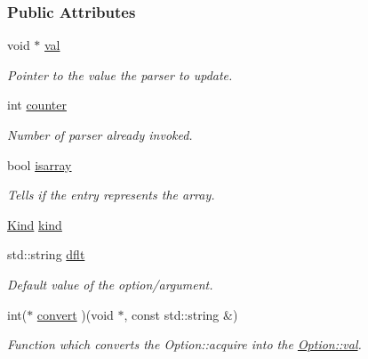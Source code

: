 \subsubsection*{Public Attributes}
\begin{DoxyCompactItemize}
\item 
void $\ast$ \hyperlink{classpoptmx_1_1Option_a8bf55fc70387f6c8929538f420d99658}{val}
\begin{DoxyCompactList}\small\item\em Pointer to the value the parser to update. \item\end{DoxyCompactList}\item 
int \hyperlink{classpoptmx_1_1Option_a00528f25b80ce6f9959418c5ef4c4c44}{counter}
\begin{DoxyCompactList}\small\item\em Number of parser already invoked. \item\end{DoxyCompactList}\item 
bool \hyperlink{classpoptmx_1_1Option_ab87e428e65c1d4c16fc8ba9952d950bb}{isarray}
\begin{DoxyCompactList}\small\item\em Tells if the entry represents the array. \item\end{DoxyCompactList}\item 
\hyperlink{group__poptmx_ga3f58821f631b466567d001183ca437e2}{Kind} \hyperlink{classpoptmx_1_1Option_a5f5719adfad302943da528300914bd8e}{kind}
\item 
std::string \hyperlink{classpoptmx_1_1Option_a53c0a40e85e0fb07ed3a368df315f69f}{dflt}
\begin{DoxyCompactList}\small\item\em Default value of the option/argument. \item\end{DoxyCompactList}\item 
int($\ast$ \hyperlink{classpoptmx_1_1Option_a2b02579efd2148ce002d0c5833864795}{convert} )(void $\ast$, const std::string \&)
\begin{DoxyCompactList}\small\item\em Function which converts the Option::acquire into the \hyperlink{classpoptmx_1_1Option_a8bf55fc70387f6c8929538f420d99658}{Option::val}. \item\end{DoxyCompactList}\item 

\end{DoxyCompactItemize}

